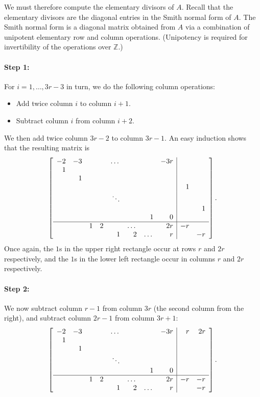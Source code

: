 \documentclass[pagesize,paper=letter]{scrartcl}
\theoremstyle{plain}
\theoremstyle{definition}
\theoremstyle{remark}
\newcommand{\Z}{\ensuremath{\mathbb{Z}}}
\begin{document}
We must therefore compute the elementary divisors of $A$. Recall that the elementary divisors are the diagonal entries in the Smith normal form of $A$. The Smith normal form is a diagonal matrix obtained from $A$ via a combination of unipotent elementary row and column operations. (Unipotency is required for invertibility of the operations over $\Z$.)

\paragraph{Step 1:}
\label{sec:step-1}

For $i = 1, \dots, 3r-3$ in turn, we do the following column operations:
\begin{itemize}
    \item Add twice column $i$ to column $i+1$.
    \item Subtract column $i$ from column $i+2$.
\end{itemize}
We then add twice column $3r-2$ to column $3r-1$. An easy induction shows that the resulting matrix is
\[
\left[\begin{array}{rrrrrrrr|rr}
  -2 & -3 & & & \dots & & & -3r & & \\
  1 & & & & & & & & & \\
  & 1 & & & & & & & & \\
  & & & & & & & & 1 & \\
  & & & & \ddots & & & & & \\
  & & & & & & & & & 1 \\
  & & & & & & 1 & 0 & & \\ \hline
  & & 1 & 2 & & \dots & & 2r & -r & \\
  & & & & 1 & 2 & \dots & r & & -r
\end{array}\right].
\]
Once again, the $1$s in the upper right rectangle occur at rows $r$ and $2r$ respectively, and the $1$s in the lower left rectangle occur in columns $r$ and $2r$ respectively.

\paragraph{Step 2:}
\label{sec:step-2}

We now subtract column $r-1$ from column $3r$ (the second column from the right), and subtract column $2r-1$ from column $3r+1$:
\[
\left[\begin{array}{rrrrrrrr|rr}
  -2 & -3 & & & \dots & & & -3r & r & 2r \\
  1 & & & & & & & & & \\
  & 1 & & & & & & & & \\
  & & & & \ddots & & & & & \\
  & & & & & & 1 & 0 & & \\ \hline
  & & 1 & 2 & & \dots & & 2r & -r & -r \\
  & & & & 1 & 2 & \dots & r & & -r
\end{array}\right].
\]
\end{document}
